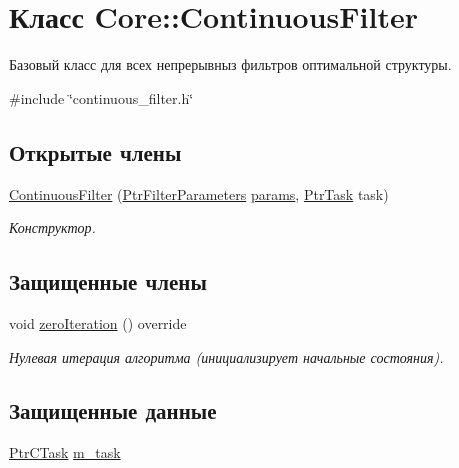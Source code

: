 \hypertarget{class_core_1_1_continuous_filter}{}\section{Класс Core\+:\+:Continuous\+Filter}
\label{class_core_1_1_continuous_filter}


Базовый класс для всех непрерывныз фильтров оптимальной структуры.  




{\ttfamily \#include \char`\"{}continuous\+\_\+filter.\+h\char`\"{}}

\subsection*{Открытые члены}
\begin{DoxyCompactItemize}
\item 
\hypertarget{class_core_1_1_continuous_filter_a5f28c1f5aaf740be3a6a8af09c0fcc22}{}\label{class_core_1_1_continuous_filter_a5f28c1f5aaf740be3a6a8af09c0fcc22} 
\hyperlink{class_core_1_1_continuous_filter_a5f28c1f5aaf740be3a6a8af09c0fcc22}{Continuous\+Filter} (\hyperlink{namespace_core_a4811af8148ba137d644b9a61a042cf03}{Ptr\+Filter\+Parameters} \hyperlink{class_core_1_1_filter_a44aa749b49ba46256975ce545531ecf7}{params}, \hyperlink{namespace_core_abfda8f69fcacfcea2696549b548ed737}{Ptr\+Task} task)
\begin{DoxyCompactList}\small\item\em Конструктор. \end{DoxyCompactList}\end{DoxyCompactItemize}
\subsection*{Защищенные члены}
\begin{DoxyCompactItemize}
\item 
void \hyperlink{class_core_1_1_continuous_filter_a4c30983f9354344717538f807855f2ae}{zero\+Iteration} () override
\begin{DoxyCompactList}\small\item\em Нулевая итерация алгоритма (инициализирует начальные состояния). \end{DoxyCompactList}\end{DoxyCompactItemize}
\subsection*{Защищенные данные}
\begin{DoxyCompactItemize}
\item 
\hyperlink{namespace_core_a95543587a560c6c497c6cadf68e03a62}{Ptr\+C\+Task} \hyperlink{class_core_1_1_continuous_filter_aaea7d47a9d573b9a88007780c4c3a722}{m\+\_\+task}
\end{DoxyCompactItemize}


